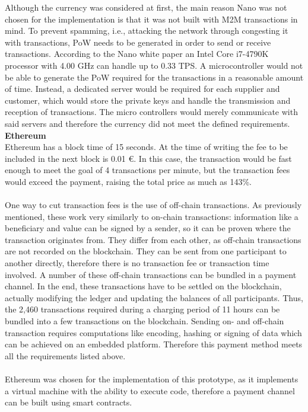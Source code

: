 Although the currency was considered at first, the main reason Nano was not chosen for the implementation is that it was not built with M2M transactions in mind.
To prevent spamming, i.e., attacking the network through congesting it with transactions, PoW needs to be generated in order to send or receive transactions.
According to the Nano white paper\cite{nano-white-paper} an Intel Core i7-4790K processor with 4.00 GHz can handle up to 0.33 TPS.
A microcontroller would not be able to generate the PoW required for the transactions in a reasonable amount of time.
Instead, a dedicated server would be required for each supplier and customer, which would store the private keys and handle the transmission and reception of transactions.
The micro controllers would merely communicate with said servers and therefore the currency did not meet the defined requirements.
\newpage
\textbf{Ethereum}\\
Ethereum has a block time of 15 seconds.
At the time of writing the fee to be included in the next block is 0.01 \euro\cite{ethereum-fee}.
In this case, the transaction would be fast enough to meet the goal of 4 transactions per minute, but the transaction fees would exceed the payment, raising the total price as much as 143\%.
\\\\
One way to cut transaction fees is the use of off-chain transactions.
As previously mentioned, these work very similarly to on-chain transactions: information like a beneficiary and value can be signed by a sender, so it can be proven where the transaction originates from.
They differ from each other, as off-chain transactions are not recorded on the blockchain.
They can be sent from one participant to another directly, therefore there is no transaction fee or transaction time involved.
A number of these off-chain transactions can be bundled in a payment channel.
In the end, these transactions have to be settled on the blockchain, actually modifying the ledger and updating the balances of all participants.
Thus, the 2,460 transactions required during a charging period of 11 hours can be bundled into a few transactions on the blockchain.
Sending on- and off-chain transaction requires computations like encoding, hashing or signing of data which can be achieved on an embedded platform.
Therefore this payment method meets all the requirements listed above.
\\\\
Ethereum was chosen for the implementation of this prototype, as it implements a virtual machine with the ability to execute code, therefore a payment channel can be built using smart contracts.
